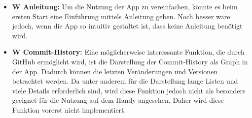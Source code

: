 \begin{itemize}
	\item \textbf{W Anleitung:} %
		Um die Nutzung der App zu vereinfachen, könnte es beim ersten Start eine Einführung mittels Anleitung geben. %
		Noch besser wäre jedoch, wenn die App so intuitiv gestaltet ist, dass keine Anleitung benötigt wird.%


	\item \textbf{W Commit-History:} %
		Eine möglicherweise interessante Funktion, die durch GitHub ermöglicht wird, ist die Darstellung der Commit-History als Graph in der App. Dadurch können die letzten Veränderungen und Versionen betrachtet werden. %
		Da unter anderem für die Darstellung lange Listen und viele Details erforderlich sind, wird diese Funktion jedoch nicht als besonders geeignet für die Nutzung auf dem Handy angesehen. %
		Daher wird diese Funktion vorerst nicht implementiert.%



\end{itemize}
